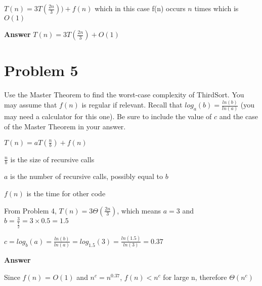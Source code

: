 \documentclass[12pt, letterpaper]{article}
\begin{document}
$T(n) = 3T(\frac{2n}{3})) + f(n)$ which in this case f(n) occurs $n$ times which is $O(1)$

\textbf{Answer} $T(n) = 3T(\frac{2n}{3}) + O(1)$

\section*{Problem 5}

Use the Master Theorem to find the worst-case complexity of ThirdSort.  You may assume that $f(n)$ is
regular if relevant.  Recall that $log_a(b) = \frac{ln(b)}{ln(a)}$ (you may need a calculator for this one).
Be sure to include the value of $c$ and the case of the Master Theorem in your answer.

\noindent
$T(n) = aT(\frac{n}{b}) + f(n)$

\noindent
$\frac{n}{b}$ is the size of recursive calls

\noindent
$a$ is the  number of recursive calls, possibly equal to $b$ 

\noindent
$f(n)$ is the time for other code

\noindent
From Problem 4, $T(n) = 3\Theta(\frac{2n}{3})$, which means $a = 3$ and $b = \frac{3}{\frac{1}{2}} = 3 \times 0.5 = 1.5$

\noindent
$c = log_b(a) = \frac{ln(b)}{ln(a)} = log_{1.5}(3) = \frac{ln(1.5)}{ln(3)} = 0.37$

\noindent
\textbf{Answer} 

Since $f(n)$ = $O(1)$ and $n^c = n^{0.37}$, $f(n) < n^c$ for large n, therefore $\Theta(n^c)$

\noindent
\end{document}
